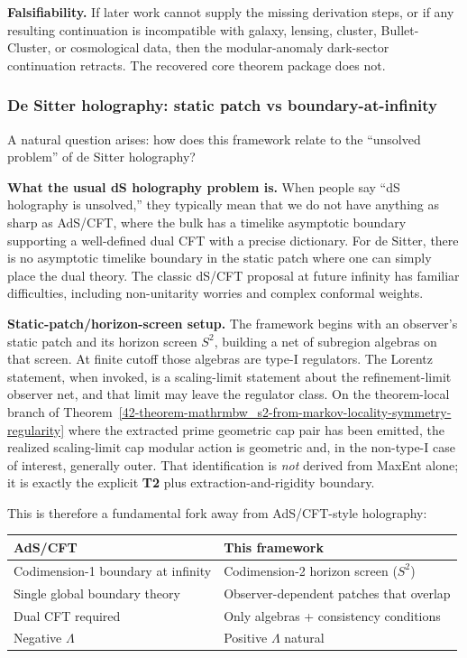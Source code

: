 \textbf{Falsifiability.} If later work cannot supply the missing derivation steps, or if any resulting continuation is incompatible with galaxy, lensing, cluster, Bullet-Cluster, or cosmological data, then the modular-anomaly dark-sector continuation retracts. The recovered core theorem package does not.

\subsubsection{De Sitter holography: static patch vs boundary-at-infinity}\label{516-de-sitter-holography-static-patch-vs-boundary-at-infinity}

A natural question arises: how does this framework relate to the ``unsolved problem'' of de Sitter holography?

\textbf{What the usual dS holography problem is.} When people say ``dS holography is unsolved,'' they typically mean that we do not have anything as sharp as AdS/CFT, where the bulk has a timelike asymptotic boundary supporting a well-defined dual CFT with a precise dictionary. For de Sitter, there is no asymptotic timelike boundary in the static patch where one can simply place the dual theory. The classic dS/CFT proposal at future infinity has familiar difficulties, including non-unitarity worries and complex conformal weights.

\textbf{Static-patch/horizon-screen setup.} The framework begins with an observer's static patch and its horizon screen \(S^2\), building a net of subregion algebras on that screen. At finite cutoff those algebras are type-I regulators. The Lorentz statement, when invoked, is a scaling-limit statement about the refinement-limit observer net, and that limit may leave the regulator class. On the theorem-local branch of Theorem~\ref{42-theorem-mathrmbw_s2-from-markov-locality-symmetry-regularity} where the extracted prime geometric cap pair has been emitted, the realized scaling-limit cap modular action is geometric and, in the non-type-I case of interest, generally outer. That identification is \emph{not} derived from MaxEnt alone; it is exactly the explicit \textbf{T2} plus extraction-and-rigidity boundary.

This is therefore a fundamental fork away from AdS/CFT-style holography:

{\def\LTcaptype{none}
\begin{longtable}[]{@{}>{\RaggedRight\arraybackslash}p{}>{\RaggedRight\arraybackslash}p{}@{}}
\toprule\noalign{}
AdS/CFT & This framework \\
\midrule\noalign{}
\endhead
\bottomrule\noalign{}
\endlastfoot
Codimension-1 boundary at infinity & Codimension-2 horizon screen (\(S^2\)) \\
Single global boundary theory & Observer-dependent patches that overlap \\
Dual CFT required & Only algebras + consistency conditions \\
Negative \(\Lambda\) & Positive \(\Lambda\) natural \\
\end{longtable}
}

